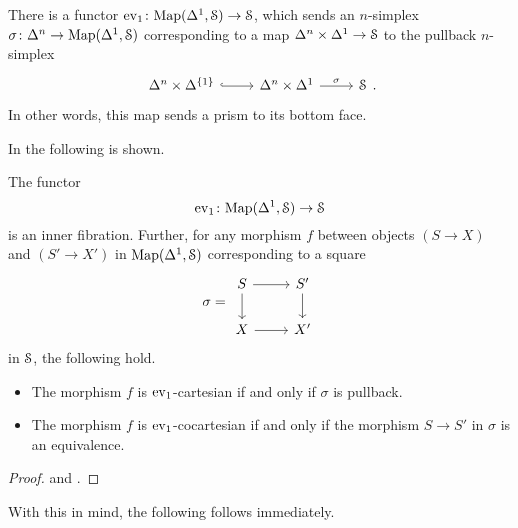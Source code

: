 \documentclass[main.tex]{subfiles}
\begin{document}
There is a functor $\ev_{1}\colon \Map(\Delta^{1}, \S) \to \S$, which sends an $n$-simplex $\sigma\colon \Delta^{n} \to \Map(\Delta^{1}, \S)$ corresponding to a map $\Delta^{n} \times \Delta^{1} \to \S$ to the pullback $n$-simplex 
\begin{equation*}
\begin{tikzcd}
  \Delta^{n} \times \Delta^{\{1\}} 
  \arrow[r, hook]
  & \Delta^{n} \times \Delta^{1}
  \arrow[r, "\sigma"]
  & \S
\end{tikzcd}.
\end{equation*}
In other words, this map sends a prism to its bottom face.

In \cite{highertopostheory} the following is shown.
\begin{proposition}
  The functor
  \begin{equation}
    \label{eq:ev1}
    \ev_{1}\colon \Map(\Delta^{1}, \S) \to \S
  \end{equation}
  is an inner fibration. Further, for any morphism $f$ between objects $(S \to X)$ and $(S' \to X')$ in $\Map(\Delta^{1}, \S)$ corresponding to a square
  \begin{equation*}
    \sigma =
    \begin{tikzcd}
      S
      \arrow[r]
      \arrow[d]
      & S'
      \arrow[d]
      \\
      X
      \arrow[r]
      & X'
    \end{tikzcd}
  \end{equation*}
  in $\S$, the following hold.
  \begin{itemize}
    \item The morphism $f$ is $\ev_{1}$-cartesian if and only if $\sigma$ is pullback.

    \item The morphism $f$ is $\ev_{1}$-cocartesian if and only if the morphism $S \to S'$ in $\sigma$ is an equivalence.
  \end{itemize}
\end{proposition}
\begin{proof}
  \cite[Lem.~6.1.1.1]{highertopostheory} and \cite[Lemma 2.4.7.12]{highertopostheory}.
\end{proof}

With this in mind, the following follows immediately.
\end{document}
